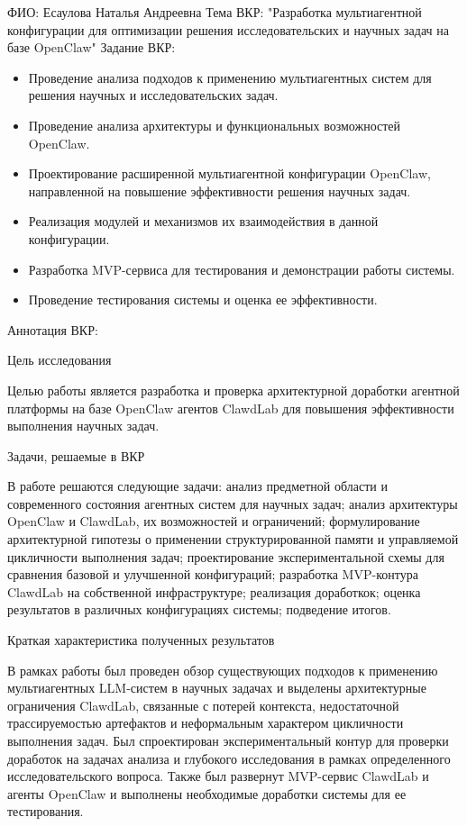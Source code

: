 ФИО: Есаулова Наталья Андреевна
Тема ВКР: "Разработка мультиагентной конфигурации для оптимизации решения исследовательских и научных задач на базе OpenClaw"
Задание ВКР:
\begin{itemize}
  \item Проведение анализа подходов к применению мультиагентных систем для решения научных и исследовательских задач.
  \item Проведение анализа архитектуры и функциональных возможностей OpenClaw.
  \item Проектирование расширенной мультиагентной конфигурации OpenClaw, направленной на повышение эффективности решения научных задач.
  \item Реализация модулей и механизмов их взаимодействия в данной конфигурации.
  \item Разработка MVP-сервиса для тестирования и демонстрации работы системы.
  \item Проведение тестирования системы и оценка ее эффективности.
\end{itemize}

Аннотация ВКР:

Цель исследования

Целью работы является разработка и проверка архитектурной доработки агентной платформы на базе OpenClaw агентов ClawdLab для повышения эффективности выполнения научных задач. 

Задачи, решаемые в ВКР

В работе решаются следующие задачи: анализ предметной области и современного состояния агентных систем для научных задач; анализ архитектуры OpenClaw и ClawdLab, их возможностей и ограничений; формулирование архитектурной гипотезы о применении структурированной памяти и управляемой цикличности выполнения задач; проектирование экспериментальной схемы для сравнения базовой и улучшенной конфигураций; разработка MVP-контура ClawdLab на собственной инфраструктуре; реализация доработкок; оценка результатов в различных конфигурациях системы; подведение итогов.

Краткая характеристика полученных результатов

В рамках работы был проведен обзор существующих подходов к применению мультиагентных LLM-систем в научных задачах и выделены архитектурные ограничения ClawdLab, связанные с потерей контекста, недостаточной трассируемостью артефактов и неформальным характером цикличности выполнения задач. Был спроектирован экспериментальный контур для проверки доработок на задачах анализа и глубокого исследования в рамках определенного исследовательского вопроса. Также был развернут MVP-сервис ClawdLab и агенты OpenClaw и выполнены необходимые доработки системы для ее тестирования.


